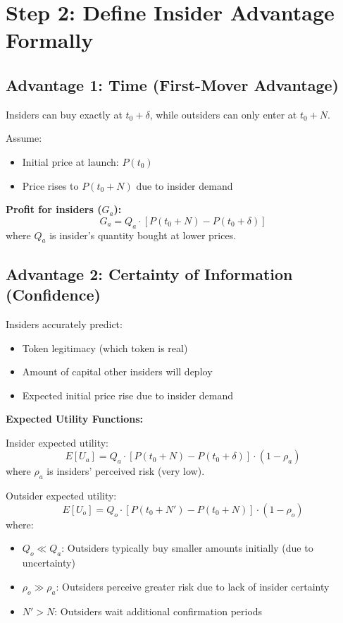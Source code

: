 \documentclass{article}
\begin{document}
\section{Step 2: Define Insider Advantage Formally}

\subsection{Advantage 1: Time (First-Mover Advantage)}

Insiders can buy exactly at $t_0 + \delta$, while outsiders can only enter at $t_0 + N$.

Assume:
\begin{itemize}
    \item Initial price at launch: $P(t_0)$
    \item Price rises to $P(t_0 + N)$ due to insider demand
\end{itemize}

\textbf{Profit for insiders ($G_a$):}
\[
G_a = Q_a \cdot [P(t_0 + N) - P(t_0 + \delta)]
\]
where $Q_a$ is insider's quantity bought at lower prices.

\subsection{Advantage 2: Certainty of Information (Confidence)}

Insiders accurately predict:
\begin{itemize}
    \item Token legitimacy (which token is real)
    \item Amount of capital other insiders will deploy
    \item Expected initial price rise due to insider demand
\end{itemize}

\textbf{Expected Utility Functions:}

Insider expected utility:
\[
E[U_a] = Q_a \cdot [P(t_0 + N) - P(t_0 + \delta)] \cdot (1 - \rho_a)
\]
where $\rho_a$ is insiders' perceived risk (very low).

Outsider expected utility:
\[
E[U_o] = Q_o \cdot [P(t_0 + N') - P(t_0 + N)] \cdot (1 - \rho_o)
\]
where:
\begin{itemize}
    \item $Q_o \ll Q_a$: Outsiders typically buy smaller amounts initially (due to uncertainty)
    \item $\rho_o \gg \rho_a$: Outsiders perceive greater risk due to lack of insider certainty
    \item $N' > N$: Outsiders wait additional confirmation periods
\end{itemize}
\end{document}
